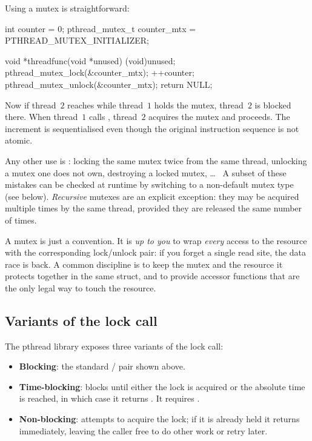 Using a mutex is straightforward:

\begin{codeblock}[language=C]
int counter = 0;
pthread_mutex_t counter_mtx = PTHREAD_MUTEX_INITIALIZER;

void *threadfunc(void *unused) {
    (void)unused;
    pthread_mutex_lock(&counter_mtx);
    ++counter;
    pthread_mutex_unlock(&counter_mtx);
    return NULL;
}
\end{codeblock}

Now if thread~$2$ reaches  while thread~$1$ holds the mutex, thread~$2$ is blocked there. When thread~$1$ calls , thread~$2$ acquires the mutex and proceeds. The increment is sequentialised even though the original instruction sequence is not atomic.

Any other use is : locking the same mutex twice from the same thread, unlocking a mutex one does not own, destroying a locked mutex, \dots~ A subset of these mistakes can be checked at runtime by switching to a non-default mutex type (see below). \emph{Recursive} mutexes are an explicit exception: they may be acquired multiple times by the same thread, provided they are released the same number of times.

\begin{tipsblock}
A mutex is just a convention. It is \emph{up to you} to wrap \emph{every} access to the resource with the corresponding lock/unlock pair: if you forget a single read site, the data race is back. A common discipline is to keep the mutex and the resource it protects together in the same struct, and to provide accessor functions that are the only legal way to touch the resource.
\end{tipsblock}

\subsection{Variants of the lock call}

The pthread library exposes three variants of the lock call:

\begin{itemize}
    \item \textbf{Blocking}: the standard / pair shown above.
    \item \textbf{Time-blocking}:  blocks until either the lock is acquired or the absolute time  is reached, in which case it returns . It requires .
    \item \textbf{Non-blocking}:  attempts to acquire the lock; if it is already held it returns  immediately, leaving the caller free to do other work or retry later.
\end{itemize}

